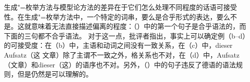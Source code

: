 生成"=枚举方法与模型论方法的差异在于它们怎么处理不同程度的话语可接受性。在生成"=枚举方法中，一个特定的词串，要么是合乎形式的表达，要么不是。这就意味着无法直接描述偏离的程度：（）中的第一个句子是合乎语法的，而下面的三句都不合乎语法。
\eal
{}
\zl
对于这一点，批评者指出，事实上可以确定例（b--d）的可接受度：在（b）中，主语和动词之间没有一致关系，在（c）中，dieser Aufsatz（这 文章）除了主谓不一致之外，格关系也不对，在（d）中，Aufsatz（文章）和dieser（这）的语序也不对。另外，（）中的句子违反了德语的语法规则，但是仍然是可以理解的。
